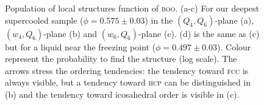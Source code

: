 \begin{figure}
	\caption{Population of local structures function of \textsc{boo}. (a-c) For our deepest supercooled sample ($\phi=0.575\pm 0.03$) in the $(Q_4,Q_6)$-plane (a), $(w_4,Q_6)$-plane (b) and $(w_6,Q_6)$-plane (c). (d) is the same as (c) but for a liquid near the freezing point ($\phi = 0.497 \pm 0.03$). Colour represent the probability to find the structure (log scale). The arrows stress the ordering tendencies: the tendency toward \textsc{fcc} is always visible, but a tendency toward \textsc{hcp} can be distinguished in (b) and the tendency toward icosahedral order is visible in (c).}
	\label{fig:maps}
\end{figure}
\tikzset{external/force remake}

